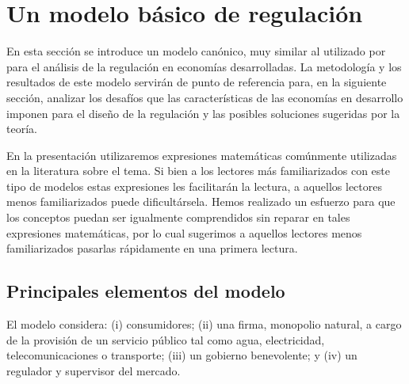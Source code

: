 \documentclass[
  12pt,
  spanish,
]{book}
\begin{document}
\hypertarget{modelo}{%
\section{Un modelo básico de regulación}\label{modelo}}

En esta sección se introduce un modelo canónico, muy similar al utilizado por \citet{Laffont2005} para el análisis de la regulación en economías desarrolladas. La metodología y los resultados de este modelo servirán de punto de referencia para, en la siguiente sección, analizar los desafíos que las características de las economías en desarrollo imponen para el diseño de la regulación y las posibles soluciones sugeridas por la teoría.

En la presentación utilizaremos expresiones matemáticas comúnmente utilizadas en la literatura sobre el tema. Si bien a los lectores más familiarizados con este tipo de modelos estas expresiones les facilitarán la lectura, a aquellos lectores menos familiarizados puede dificultársela. Hemos realizado un esfuerzo para que los conceptos puedan ser igualmente comprendidos sin reparar en tales expresiones matemáticas, por lo cual sugerimos a aquellos lectores menos familiarizados pasarlas rápidamente en una primera lectura.

\hypertarget{principales-elementos-del-modelo}{%
\subsection{Principales elementos del modelo}\label{principales-elementos-del-modelo}}

El modelo considera: (i) consumidores; (ii) una firma, monopolio natural, a cargo de la provisión de un servicio público tal como agua, electricidad, telecomunicaciones o transporte; (iii) un gobierno benevolente; y (iv) un regulador y supervisor del mercado.
\end{document}
